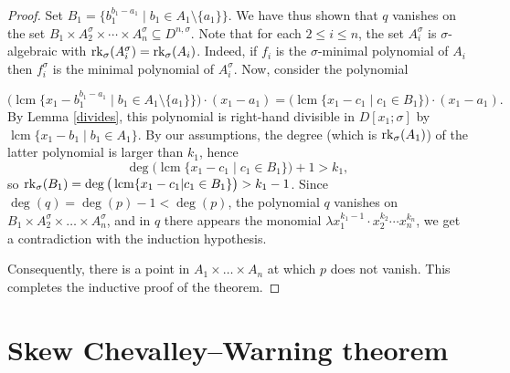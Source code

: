 \documentclass[11pt,reqno]{amsart}
\theoremstyle{definition}
\DeclareMathOperator{\lcm}{lcm}
\newcommand{\st}{{|}}
\newcommand{\rk}{{\rm rk}}
\begin{document}
\begin{proof}
 Set $B_1 = \{b_1^{b_1-a_1} \mid b_1 \in A_1 \setminus \{a_1\} \}$. We have thus shown that $q$ vanishes on the set $B_1 \times A^\sigma_2 \times \cdots \times A^\sigma_n \subseteq D^{n,\sigma}$. Note that for each $2 \leq i \leq n$, the set $A_i^\sigma$ is $\sigma$-algebraic with $\rk_\sigma(A_i^\sigma) = \rk_\sigma(A_i)$. Indeed, if $f_i$ is the $\sigma$-minimal polynomial of $A_i$ then $f_i^\sigma$ is the minimal polynomial of $A_i^\sigma$. Now, consider the polynomial

$$\big(\lcm\{x_1-b_1^{b_1-a_1} \mid b_1 \in A_1\setminus\{a_1\}\}\big)\cdot(x_1-a_1) = \big(\lcm\{x_1-c_1 \mid c_1 \in B_1\}\big)\cdot(x_1-a_1).$$
By Lemma \ref{divides}, this polynomial is right-hand divisible in $D[x_1;\sigma]$ by $\lcm\{x_1-b_1 \mid b_1 \in A_1\}$. By our assumptions, the degree (which is $\rk_\sigma(A_1)$) of the latter polynomial is larger than $k_1$, hence 
$$\deg\big(\lcm\{x_1-c_1 \mid c_1 \in B_1\}\big) + 1 > k_1,
$$ so $\rk_\sigma(B_1) = \deg\big(\lcm\{x_1-c_1 \st c_1 \in B_1\}\big) > k_1-1$. Since $\deg(q) =\deg(p)-1 < \deg(p)$, the polynomial $q$ vanishes on $B_1 \times A_2^\sigma \times \dots \times A_n^\sigma$, and in $q$ there appears the monomial $\lambda x_1^{k_1-1}\cdot x_2^{k_2} \cdots x_n^{k_n}$, we get a contradiction with the induction hypothesis. 

Consequently, there is a point in $A_1\times \dots \times A_n$ at which $p$ does not vanish. This completes the inductive proof of the theorem. \end{proof}

\section{Skew Chevalley--Warning theorem}\label{sec:cheval}
\end{document}
